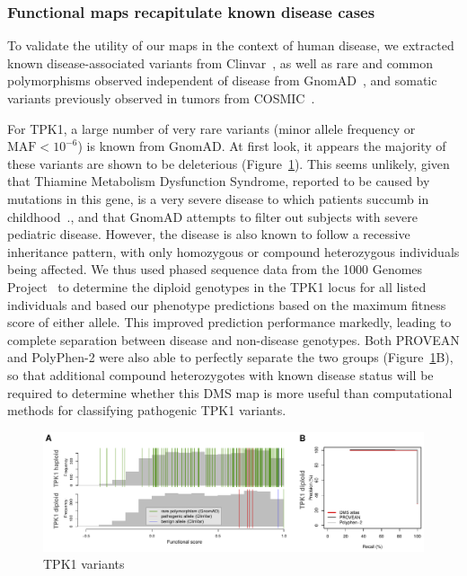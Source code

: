 \subsubsection{Functional maps recapitulate known disease cases}

To validate the utility of our maps in the context of human disease, we extracted known disease-associated variants from Clinvar~\cite{landrum_clinvar:_2016}, as well as rare and common polymorphisms observed independent of disease from GnomAD~\cite{lek_analysis_2016}, and somatic variants previously observed in tumors from COSMIC~\cite{forbes_cosmic:_2001}. 

For TPK1, a large number of very rare variants (minor allele frequency or $\text{MAF} < 10^{-6}$) is known from GnomAD. At first look, it appears the majority of these variants are shown to be deleterious (Figure~\ref{fig:tpk1_diploid}). This seems unlikely, given that Thiamine Metabolism Dysfunction Syndrome, reported to be caused by mutations in this gene, is a very severe disease to which patients succumb in childhood~\cite{mayr_thiamine_2011}., and that GnomAD attempts to filter out subjects with severe pediatric disease. However, the disease is also known to follow a recessive inheritance pattern, with only homozygous or compound heterozygous individuals being affected. We thus used phased sequence data from the 1000 Genomes Project~\cite{the_1000_genomes_project_consortium_global_2015} to determine the diploid genotypes in the TPK1 locus for all listed individuals and based our phenotype predictions based on the maximum fitness score of either allele. This improved prediction performance markedly, leading to complete separation between disease and non-disease genotypes. Both PROVEAN and PolyPhen-2 were also able to perfectly separate the two groups (Figure~\ref{fig:tpk1_diploid}B), so that additional compound heterozygotes with known disease status will be required to determine whether this DMS map is more useful than computational methods for classifying pathogenic TPK1 variants. 

\begin{figure}[h!]
	\centering
	\includegraphics[width=\textwidth]{img/diploid.pdf}
	\caption{TPK1 variants}
	\label{fig:tpk1_diploid}
\end{figure}


